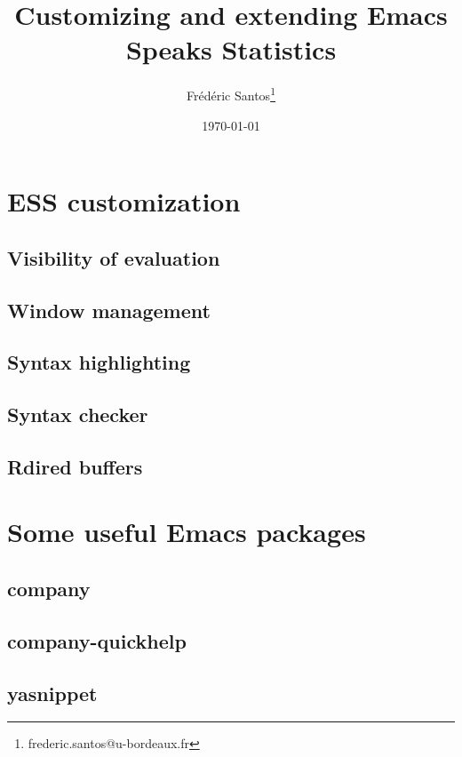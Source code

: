 \documentclass[presentation]{beamer}
\author{Frédéric Santos\thanks{frederic.santos@u-bordeaux.fr}}
\date{\today}
\title{Customizing and extending Emacs Speaks Statistics}
\begin{document}
\maketitle


\section{ESS customization}
\label{sec:org922d0a0}
\subsection{Visibility of evaluation}
\label{sec:org6b800e4}
\subsection{Window management}
\label{sec:orgbe296f9}
\subsection{Syntax highlighting}
\label{sec:orgddf22d1}
\subsection{Syntax checker}
\label{sec:org44b0a54}
\subsection{Rdired buffers}
\label{sec:orga00d20a}

\section{Some useful Emacs packages}
\label{sec:org1ae4bd4}
\subsection{company}
\label{sec:org8f9531d}
\subsection{company-quickhelp}
\label{sec:orgf9d3bc7}
\subsection{yasnippet}
\label{sec:org81dad7a}
\end{document}
